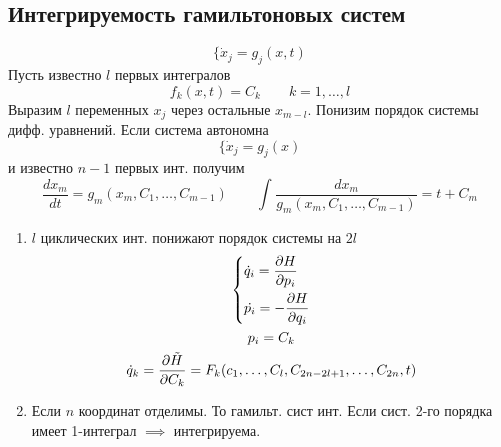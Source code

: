 \documentclass{article}
\begin{document}
\subsection{Интегрируемость гамильтоновых систем}
  \[
    \{\dot{x}_j=g_j(x,t)
  \]
  Пусть известно $l$ первых интегралов
  \[
    f_k(x,t)=C_k \qquad k=1,\dots ,l
  \]
  Выразим $l$ переменных $x_j$ через остальные $x_{m-l}$.
  Понизим порядок системы дифф. уравнений.
  Если система автономна
  \[
    \{\dot{x}_j=g_j(x)
    \]
    и известно $n-1$ первых инт. получим
  \[
    \frac{dx_m}{dt}=g_m(x_m,C_1,\dots ,C_{m-1}) \qquad \int_{}^{}\frac{dx_m}{g_m(x_m,C_1,\dots ,C_{m-1})}=t+C_m
  \]

\begin{enumerate}
  \item $l$ циклических инт. понижают порядок системы на $2l$
    \begin{gather*}
      \left\{\begin{aligned}
        &\dot{q}_i=\frac{\partial{H}}{\partial{p_i}} \\ 
        &\dot{p_i}=-\frac{\partial{H}}{\partial{q_i}}
      \end{aligned}\right. \\ 
      p_i = C_k \\ 
      \dot{q}_k=\frac{\partial{\tilde{H}}}{\partial{C_k}}=F_k(c_1,\dots ,C_l,C_{2n-2l+1},\dots ,C_{2n},t)
    \end{gather*}
  \item Если $n$ координат отделимы. То гамильт. сист инт.
    Если сист. 2-го порядка имеет 1-интеграл $\implies$ интегрируема.
\end{enumerate}
\end{document}
